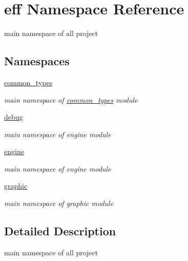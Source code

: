 \hypertarget{namespaceeff}{}\section{eff Namespace Reference}
\label{namespaceeff}


main namespace of all project  


\subsection*{Namespaces}
\begin{DoxyCompactItemize}
\item 
 \hyperlink{namespaceeff_1_1common__types}{common\+\_\+types}
\begin{DoxyCompactList}\small\item\em main namespace of \hyperlink{namespaceeff_1_1common__types}{common\+\_\+types} module \end{DoxyCompactList}\item 
 \hyperlink{namespaceeff_1_1debug}{debug}
\begin{DoxyCompactList}\small\item\em main namespace of engine module \end{DoxyCompactList}\item 
 \hyperlink{namespaceeff_1_1engine}{engine}
\begin{DoxyCompactList}\small\item\em main namespace of engine module \end{DoxyCompactList}\item 
 \hyperlink{namespaceeff_1_1graphic}{graphic}
\begin{DoxyCompactList}\small\item\em main namespace of graphic module \end{DoxyCompactList}\end{DoxyCompactItemize}


\subsection{Detailed Description}
main namespace of all project 